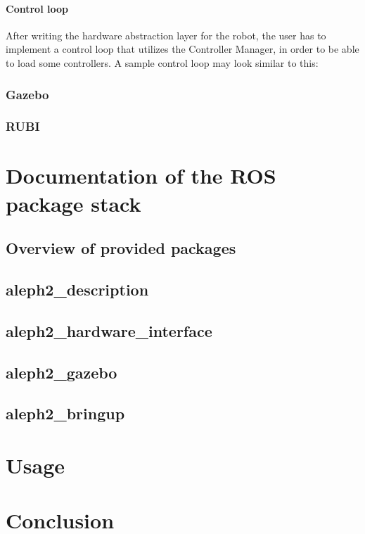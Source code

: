 \documentclass[english,inz,shortabstract]{iithesis}
\begin{document}
    \subsubsection{Control loop}
    After writing the hardware abstraction layer for the robot, the user has to implement a control loop that utilizes the Controller Manager, in order to be able to load some controllers. A sample control loop may look similar to this:

    

    \subsection{Gazebo}

    \subsection{RUBI}


\chapter{Documentation of the ROS package stack}

\section{Overview of provided packages}

\section{aleph2\_description}

\section{aleph2\_hardware\_interface}

\section{aleph2\_gazebo}

\section{aleph2\_bringup}

\chapter{Usage}

\chapter{Conclusion}



\end{document}
